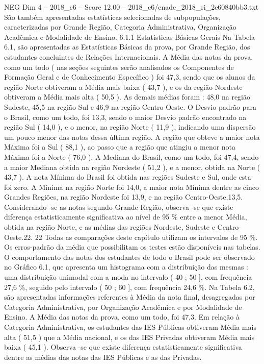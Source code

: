 \begin{textsample}{NEG Dim 4 – 2018\_c6 – Score 12.00 – 2018\_c6/enade\_2018\_ri\_2e60840bb3.txt}
São também apresentadas estatísticas selecionadas de subpopulações, caracterizadas por Grande Região, Categoria Administrativa, Organização Acadêmica e Modalidade de Ensino. 6.1.1 Estatísticas Básicas Gerais Na Tabela 6.1, são apresentadas as Estatísticas Básicas da prova, por Grande Região, dos estudantes concluintes de Relações Internacionais.
A Média das notas da prova, como um todo ( nas seções seguintes serão analisados os Componentes de Formação Geral e de Conhecimento Específico ) foi 47,3, sendo que os alunos da região Norte obtiveram a Média mais baixa ( 43,7 ), e os da região Nordeste obtiveram a Média mais alta ( 50,5 ).
As demais médias foram : 48,0 na região Sudeste, 45,5 na região Sul e 46,9 na região Centro-Oeste.
O Desvio padrão para o Brasil, como um todo, foi 13,3, sendo o maior Desvio padrão encontrado na região Sul ( 14,0 ), e o menor, na região Norte ( 11,9 ), indicando uma dispersão um pouco menor das notas dessa última região.
A região que obteve a maior nota Máxima foi a Sul ( 88,1 ), ao passo que a região que atingiu a menor nota Máxima foi a Norte ( 76,0 ).
A Mediana do Brasil, como um todo, foi 47,4, sendo a maior Mediana obtida na região Nordeste ( 51,2 ), e a menor, obtida na Norte ( 43,7 ).
A nota Mínima do Brasil foi obtida nas regiões Sudeste e Sul, onde esta foi zero.
A Mínima na região Norte foi 14,0, a maior nota Mínima dentre as cinco Grandes Regiões, na região Nordeste foi 13,9, e na região Centro-Oeste,13,5.
Considerando -se as notas segundo Grande Região, observa -se que existe diferença estatisticamente significativa ao nível de 95 \% entre a menor Média, obtida na região Norte, e as médias das regiões Nordeste, Sudeste e Centro-Oeste.22. 22 Todas as comparações deste capítulo utilizam os intervalos de 95 \%.
Os erros-padrão da média que possibilitam os testes estão disponíveis nas tabelas.
O comportamento das notas dos estudantes de todo o Brasil pode ser observado no Gráfico 6.1, que apresenta um histograma com a distribuição das mesmas : uma distribuição unimodal com a moda no intervalo ( 40 ; 50 ], com frequência 27,6 \%, seguido pelo intervalo ( 50 ; 60 ], com frequência 24,6 \%.
Na Tabela 6.2, são apresentadas informações referentes à Média da nota final, desagregadas por Categoria Administrativa, por Organização Acadêmica e por Modalidade de Ensino.
A Média das notas da prova, como um todo, foi 47,3.
Em relação à Categoria Administrativa, os estudantes das IES Públicas obtiveram Média mais alta ( 51,5 ) que a Média nacional, e os das IES Privadas obtiveram Média mais baixa ( 45,1 ).
Observa -se que existe diferença estatisticamente significativa dentre as médias das notas das IES Públicas e as das Privadas.

\end{textsample}
